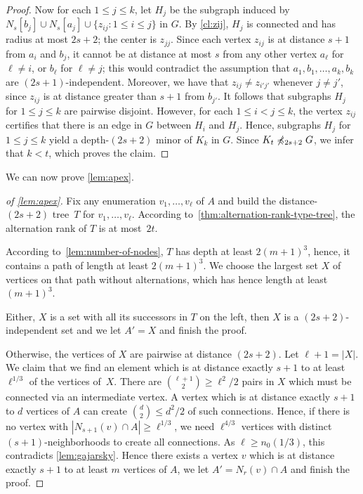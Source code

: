 \begin{proof}
Now for each $1\leq j\leq k$, let $H_j$ be the subgraph induced by $N_s[b_j]\cup N_s[a_j]\cup\{z_{ij} \colon 1\leq i\leq j\}$ in $G$.
By \cref{cl:zij}, $H_j$ is connected and has radius at most $2s+2$; the center is $z_{jj}$.
Since each vertex $z_{ij}$ is at distance $s+1$ from $a_i$ and $b_j$, it cannot be at distance at most $s$ from any other vertex $a_\ell$ for $\ell\neq i$, or $b_\ell$ for $\ell\neq j$;
this would contradict the assumption that $a_1,b_1,\ldots,a_k,b_k$ are $(2s+1)$-independent.
Moreover, we have that $z_{ij}\neq z_{i'j'}$ whenever $j\neq j'$, since $z_{ij}$ is at distance greater than $s+1$ from $b_{j'}$.
It follows that subgraphs $H_j$ for $1\leq j\leq k$ are pairwise disjoint.
However, for each $1\leq i<j\leq k$, the vertex $z_{ij}$ certifies that there is an edge in $G$ between $H_i$ and $H_j$.
Hence, subgraphs $H_j$ for $1\leq j\leq k$ yield a depth-$(2s+2)$ minor of $K_k$ in $G$.
Since $K_t\not\preccurlyeq_{2s+2} G$, we infer that $k<t$, which proves the claim.
\end{proof}

%


We can now prove \cref{lem:apex}. 

\begin{proof}[of \cref{lem:apex}]
Fix any enumeration $v_1,\ldots, v_\ell$ of $A$ and
build the distance-$(2s+2)$ tree~$T$ for
$v_1,\ldots,v_\ell$. According to~\cref{thm:alternation-rank-type-tree}, 
the alternation rank of $T$ is at most~$2t$. 

According 
to~\cref{lem:number-of-nodes}, $T$ has depth at least $2(m+1)^3$, hence, 
it contains a path of length at least $2(m+1)^3$. We choose the largest set $X$
of vertices on that path without alternations, which has hence length
at least $(m+1)^3$. 

Either, $X$ is a set with all its successors in $T$ on the left, 
then $X$ is a $(2s+2)$-independent set and we let $A'=X$ and finish the proof.

Otherwise, the vertices of $X$ are pairwise at distance $(2s+2)$. Let $\ell+1=|X|$. 
We claim that we find an element which is at distance exactly $s+1$ 
to at least $\ell^{1/3}$
of the vertices of~$X$. There are $\binom{\ell+1}{2}\geq \ell^2/2$ pairs in $X$ which 
must be connected via an intermediate vertex. A vertex which is at distance
exactly $s+1$ to $d$ vertices of $A$ can create $\binom{d}{2}\leq d^2/2$ of such connections. 
Hence, if there is no vertex with $|N_{s+1}(v)\cap A|\geq \ell^{1/3}$, 
we need $\ell^{4/3}$ vertices with distinct $(s+1)$-neighborhoods
to create all connections. As $\ell\geq n_0(1/3)$, 
this contradicts \cref{lem:gajarsky}. Hence there exists a vertex $v$ which is 
at distance exactly $s+1$ to at least $m$ vertices of $A$, 
we let $A'=N_r(v)\cap A$ and finish the proof. 
\end{proof}

